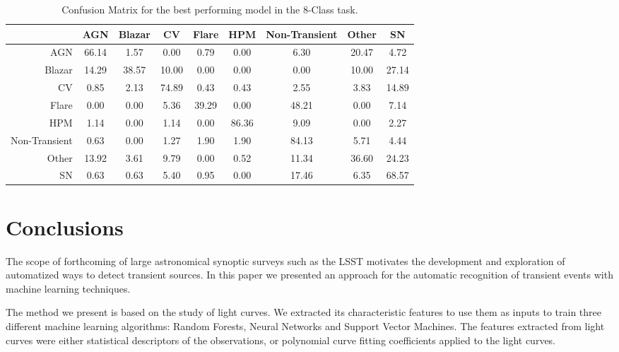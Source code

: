 \documentclass[a4paper,fleqn,usenatbib]{mnras}
\begin{document}
\begin{table}
\centering
\begin{tabular}{|r|c|c|c|c|c|c|c|c|}
\hline
\multicolumn{1}{|l|}{} & AGN    & Blazar    & CV   & Flare   & HPM   & Non-Transient   & Other   & SN  \\ \hline \hline
AGN                & 66.14       & 1.57       & 0.00      & 0.79      & 0.00      & 6.30      & 20.47      & 4.72     \\ \hline
Blazar                & 14.29       & 38.57       & 10.00      & 0.00      & 0.00      & 0.00      & 10.00      & 27.14     \\ \hline
CV                & 0.85       & 2.13       & 74.89      & 0.43      & 0.43      & 2.55      & 3.83      & 14.89     \\ \hline
Flare                & 0.00       & 0.00       & 5.36      & 39.29      & 0.00      & 48.21      & 0.00      & 7.14     \\ \hline
HPM                & 1.14       & 0.00       & 1.14      & 0.00      & 86.36      & 9.09      & 0.00      & 2.27     \\ \hline
Non-Transient                & 0.63       & 0.00       & 1.27      & 1.90      & 1.90      & 84.13      & 5.71      & 4.44     \\ \hline
Other                & 13.92       & 3.61       & 9.79      & 0.00      & 0.52      & 11.34      & 36.60      & 24.23     \\ \hline
SN                & 0.63       & 0.63       & 5.40      & 0.95      & 0.00      & 17.46      & 6.35      & 68.57     \\ \hline
\end{tabular}
\caption{Confusion Matrix for the best performing model in the 8-Class task.}
\label{Confusion-8-Class}
\end{table}



\section{Conclusions}

The scope of forthcoming of large astronomical synoptic surveys such
as the LSST \citep{0805.2366} motivates the development and
exploration of automatized ways to detect transient sources.
In this paper we presented an approach for the automatic recognition
of transient events with machine learning techniques.   

The method we present is based on the study of light curves. 
We extracted its characteristic features to use them as inputs
to train three different machine learning algorithms: Random Forests,
Neural Networks and Support Vector Machines.
The features extracted from light curves were either statistical
descriptors of the observations, or polynomial curve fitting
coefficients applied to the light curves.   
\end{document}
